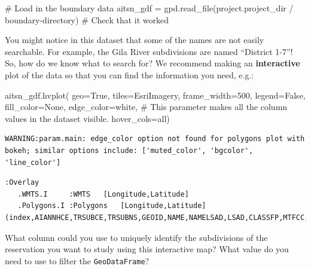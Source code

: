 \documentclass[
  letterpaper,
  DIV=11,
  numbers=noendperiod,
  oneside]{scrreprt}
\newenvironment{Shaded}{\begin{snugshade}}{\end{snugshade}}
\newcommand{\CommentTok}[1]{\textcolor[rgb]{0.37,0.37,0.37}{#1}}
\newcommand{\DecValTok}[1]{\textcolor[rgb]{0.68,0.00,0.00}{#1}}
\newcommand{\NormalTok}[1]{\textcolor[rgb]{0.00,0.23,0.31}{#1}}
\newcommand{\OperatorTok}[1]{\textcolor[rgb]{0.37,0.37,0.37}{#1}}
\newcommand{\StringTok}[1]{\textcolor[rgb]{0.13,0.47,0.30}{#1}}
\newcommand{\VariableTok}[1]{\textcolor[rgb]{0.07,0.07,0.07}{#1}}
\begin{document}
\begin{Shaded}
\begin{Highlighting}[]
\CommentTok{\# Load in the boundary data}
\NormalTok{aitsn\_gdf }\OperatorTok{=}\NormalTok{ gpd.read\_file(project.project\_dir }\OperatorTok{/} \StringTok{\textquotesingle{}boundary{-}directory\textquotesingle{}}\NormalTok{)}
\CommentTok{\# Check that it worked}
\end{Highlighting}
\end{Shaded}

You might notice in this dataset that some of the names are not easily
searchable. For example, the Gila River subdivisions are named
``District 1-7''! So, how do we know what to search for? We recommend
making an \textbf{interactive} plot of the data so that you can find the
information you need, e.g.:

\begin{Shaded}
\begin{Highlighting}[]
\NormalTok{aitsn\_gdf.hvplot(}
\NormalTok{    geo}\OperatorTok{=}\VariableTok{True}\NormalTok{, tiles}\OperatorTok{=}\StringTok{\textquotesingle{}EsriImagery\textquotesingle{}}\NormalTok{, }
\NormalTok{    frame\_width}\OperatorTok{=}\DecValTok{500}\NormalTok{,}
\NormalTok{    legend}\OperatorTok{=}\VariableTok{False}\NormalTok{, fill\_color}\OperatorTok{=}\VariableTok{None}\NormalTok{, edge\_color}\OperatorTok{=}\StringTok{\textquotesingle{}white\textquotesingle{}}\NormalTok{,}
    \CommentTok{\# This parameter makes all the column values in the dataset visible.}
\NormalTok{    hover\_cols}\OperatorTok{=}\StringTok{\textquotesingle{}all\textquotesingle{}}\NormalTok{)}
\end{Highlighting}
\end{Shaded}

\begin{verbatim}
WARNING:param.main: edge_color option not found for polygons plot with bokeh; similar options include: ['muted_color', 'bgcolor', 'line_color']
\end{verbatim}

\begin{verbatim}
:Overlay
   .WMTS.I     :WMTS   [Longitude,Latitude]
   .Polygons.I :Polygons   [Longitude,Latitude]   (index,AIANNHCE,TRSUBCE,TRSUBNS,GEOID,NAME,NAMELSAD,LSAD,CLASSFP,MTFCC,FUNCSTAT,ALAND,AWATER,INTPTLAT,INTPTLON)
\end{verbatim}

\begin{tcolorbox}[enhanced jigsaw, colbacktitle=quarto-callout-color!10!white, opacityback=0, bottomtitle=1mm, toptitle=1mm, bottomrule=.15mm, left=2mm, colframe=quarto-callout-color-frame, leftrule=.75mm, opacitybacktitle=0.6, colback=white, rightrule=.15mm, toprule=.15mm, breakable, titlerule=0mm, title=\textcolor{quarto-callout-color}{\faInfo}\hspace{0.5em}{Reflect and Respond}, coltitle=black, arc=.35mm]

What column could you use to uniquely identify the subdivisions of the
reservation you want to study using this interactive map? What value do
you need to use to filter the \texttt{GeoDataFrame}?

\end{tcolorbox}
\end{document}
